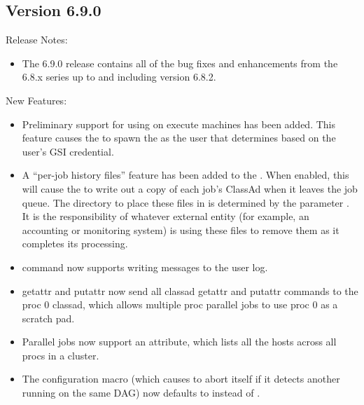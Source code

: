 \subsection*{\label{sec:New-6-9-0}Version 6.9.0}

\noindent Release Notes:

\begin{itemize}

\item The 6.9.0 release contains all of the bug fixes and enhancements
  from the 6.8.x series up to and including version 6.8.2.


\end{itemize}


\noindent New Features:

\begin{itemize}


\item Preliminary support for using  on execute machines
has been added.  This feature causes the  to spawn the
 as the user that  determines based on
the user's GSI credential.

\item A ``per-job history files'' feature has been added to the
. When enabled, this will cause the  to
write out a copy of each job's ClassAd when it leaves the job
queue. The directory to place these files in is determined by the
parameter . It is the responsibility of
whatever external entity (for example, an accounting or monitoring system) is
using these files to remove them as it completes its processing.

\item {} command now supports writing messages to the user log.

\item {} getattr and putattr now send all classad getattr
and putattr commands to the proc 0 classad, which allows multiple proc
parallel jobs to use proc 0 as a scratch pad.

\item Parallel jobs now support an  attribute,
which lists all the hosts across all procs in a cluster.

\item The  configuration macro (which causes
 to abort itself if it detects another 
running on the same DAG) now defaults to  instead of
.

\end{itemize}

